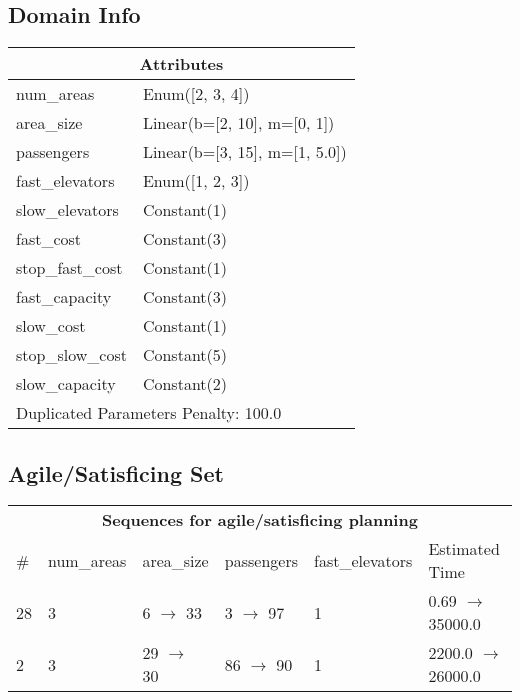 \documentclass{article}
\begin{document}
                    \subsection*{Domain Info}

                    \begin{center}
                    \begin{tabular}{p{}p{}}
                    \multicolumn{2}{c}{\bf \large Attributes}\\\midrule
                    num\_areas & Enum([2, 3, 4])\\
area\_size & Linear(b=[2, 10], m=[0, 1])\\
passengers & Linear(b=[3, 15], m=[1, 5.0])\\
fast\_elevators & Enum([1, 2, 3])\\
slow\_elevators & Constant(1)\\
fast\_cost & Constant(3)\\
stop\_fast\_cost & Constant(1)\\
fast\_capacity & Constant(3)\\
slow\_cost & Constant(1)\\
stop\_slow\_cost & Constant(5)\\
slow\_capacity & Constant(2)
                    
                     \\\midrule
                    \multicolumn{2}{l}{Duplicated Parameters Penalty: 100.0}
                    \end{tabular}
                    \end{center}
                
                         \subsection*{Agile/Satisficing Set}

                        \begin{center}
                        \begin{tabular}{l|l|l|l|l|l}
                        \multicolumn{6}{c}{\bf \large Sequences for agile/satisficing planning}\\
                        \# & num\_areas & area\_size & passengers & fast\_elevators & Estimated Time\\\midrule
                        28&3&6 $\rightarrow$ 33&3 $\rightarrow$ 97&1&0.69 $\rightarrow$ 35000.0\\
2&3&29 $\rightarrow$ 30&86 $\rightarrow$ 90&1&2200.0 $\rightarrow$ 26000.0
                        \end{tabular}
                        \end{center}
                    
\end{document}

